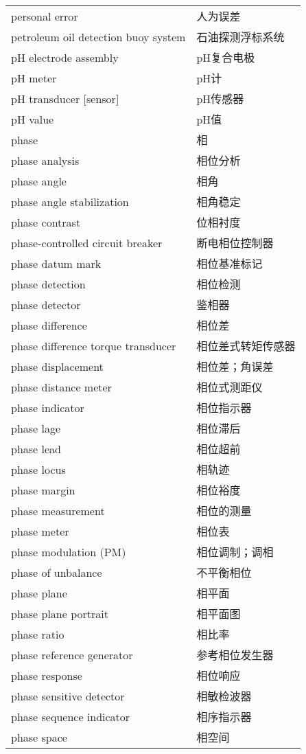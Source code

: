 \documentclass[
]{article}
\begin{document}
\begin{longtable}[]{@{}ll@{}}
personal error & 人为误差 \\
petroleum oil detection buoy system & 石油探测浮标系统 \\
pH electrode assembly & pH复合电极 \\
pH meter & pH计 \\
pH transducer {[}sensor{]} & pH传感器 \\
pH value & pH值 \\
phase & 相 \\
phase analysis & 相位分析 \\
phase angle & 相角 \\
phase angle stabilization & 相角稳定 \\
phase contrast & 位相衬度 \\
phase-controlled circuit breaker & 断电相位控制器 \\
phase datum mark & 相位基准标记 \\
phase detection & 相位检测 \\
phase detector & 鉴相器 \\
phase difference & 相位差 \\
phase difference torque transducer & 相位差式转矩传感器 \\
phase displacement & 相位差；角误差 \\
phase distance meter & 相位式测距仪 \\
phase indicator & 相位指示器 \\
phase lage & 相位滞后 \\
phase lead & 相位超前 \\
phase locus & 相轨迹 \\
phase margin & 相位裕度 \\
phase measurement & 相位的测量 \\
phase meter & 相位表 \\
phase modulation (PM) & 相位调制；调相 \\
phase of unbalance & 不平衡相位 \\
phase plane & 相平面 \\
phase plane portrait & 相平面图 \\
phase ratio & 相比率 \\
phase reference generator & 参考相位发生器 \\
phase response & 相位响应 \\
phase sensitive detector & 相敏检波器 \\
phase sequence indicator & 相序指示器 \\
phase space & 相空间 \\

\end{longtable}
\end{document}
